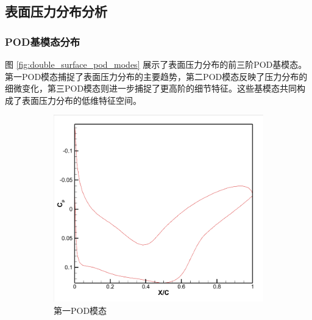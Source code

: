 \subsection{表面压力分布分析}

\subsubsection{POD基模态分布}

图 \ref{fig:double_surface_pod_modes} 展示了表面压力分布的前三阶POD基模态。第一POD模态捕捉了表面压力分布的主要趋势，第二POD模态反映了压力分布的细微变化，第三POD模态则进一步捕捉了更高阶的细节特征。这些基模态共同构成了表面压力分布的低维特征空间。

\begin{figure}[H]
    \centering
    \begin{subfigure}[b]{0.32\textwidth}
        \includegraphics[width=\textwidth]{image/基压力分布图/双变量表面压力基1.png}
        \caption{第一POD模态}
    \end{subfigure}
    \begin{subfigure}[b]{0.32\textwidth}

\end{subfigure}
\end{figure}
